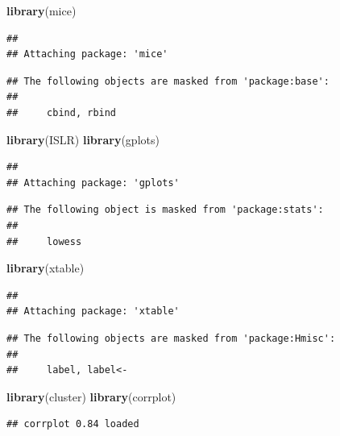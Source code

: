 \documentclass[]{article}
\newenvironment{Shaded}{\begin{snugshade}}{\end{snugshade}}
\newcommand{\KeywordTok}[1]{\textcolor[rgb]{0.13,0.29,0.53}{\textbf{#1}}}
\newcommand{\NormalTok}[1]{#1}
\begin{document}
\begin{Shaded}
\begin{Highlighting}[]
\KeywordTok{library}\NormalTok{(mice)}
\end{Highlighting}
\end{Shaded}

\begin{verbatim}
## 
## Attaching package: 'mice'
\end{verbatim}

\begin{verbatim}
## The following objects are masked from 'package:base':
## 
##     cbind, rbind
\end{verbatim}

\begin{Shaded}
\begin{Highlighting}[]
\KeywordTok{library}\NormalTok{(ISLR)}
\KeywordTok{library}\NormalTok{(gplots)}
\end{Highlighting}
\end{Shaded}

\begin{verbatim}
## 
## Attaching package: 'gplots'
\end{verbatim}

\begin{verbatim}
## The following object is masked from 'package:stats':
## 
##     lowess
\end{verbatim}

\begin{Shaded}
\begin{Highlighting}[]
\KeywordTok{library}\NormalTok{(xtable)}
\end{Highlighting}
\end{Shaded}

\begin{verbatim}
## 
## Attaching package: 'xtable'
\end{verbatim}

\begin{verbatim}
## The following objects are masked from 'package:Hmisc':
## 
##     label, label<-
\end{verbatim}

\begin{Shaded}
\begin{Highlighting}[]
\KeywordTok{library}\NormalTok{(cluster)}
\KeywordTok{library}\NormalTok{(corrplot)}
\end{Highlighting}
\end{Shaded}

\begin{verbatim}
## corrplot 0.84 loaded
\end{verbatim}
\end{document}
